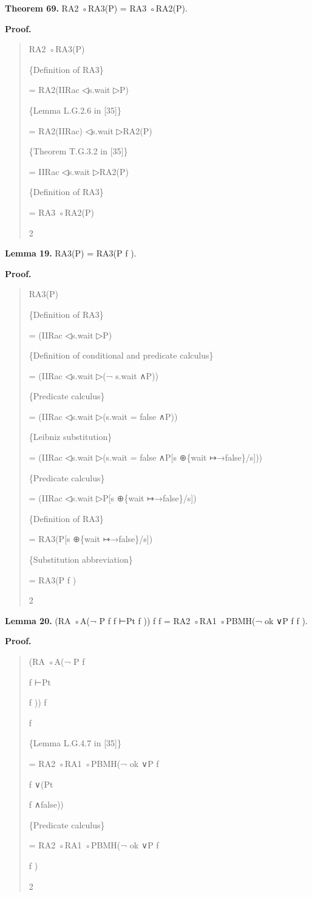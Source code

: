 \documentclass[11pt]{article}
\begin{document}
\noindent\textbf{Theorem 69.} RA2 ◦RA3(P) = RA3 ◦RA2(P).


\noindent\textbf{Proof.}


\begin{quote}\small\raggedright
RA2 ◦RA3(P)
\par
\{Definition of RA3\}
\par
= RA2(IIRac ◁s.wait ▷P)
\par
\{Lemma L.G.2.6 in [35]\}
\par
= RA2(IIRac) ◁s.wait ▷RA2(P)
\par
\{Theorem T.G.3.2 in [35]\}
\par
= IIRac ◁s.wait ▷RA2(P)
\par
\{Definition of RA3\}
\par
= RA3 ◦RA2(P)
\par
2
\end{quote}

\noindent\textbf{Lemma 19.} RA3(P) = RA3(P f ).


\noindent\textbf{Proof.}


\begin{quote}\small\raggedright
RA3(P)
\par
\{Definition of RA3\}
\par
= (IIRac ◁s.wait ▷P)
\par
\{Definition of conditional and predicate calculus\}
\par
= (IIRac ◁s.wait ▷(¬ s.wait ∧P))
\par
\{Predicate calculus\}
\par
= (IIRac ◁s.wait ▷(s.wait = false ∧P))
\par
\{Leibniz substitution\}
\par
= (IIRac ◁s.wait ▷(s.wait = false ∧P[s ⊕\{wait ↦→false\}/s]))
\par
\{Predicate calculus\}
\par
= (IIRac ◁s.wait ▷P[s ⊕\{wait ↦→false\}/s])
\par
\{Definition of RA3\}
\par
= RA3(P[s ⊕\{wait ↦→false\}/s])
\par
\{Substitution abbreviation\}
\par
= RA3(P f )
\par
2
\end{quote}

\noindent\textbf{Lemma 20.} (RA ◦A(¬ P f f ⊢Pt f )) f f = RA2 ◦RA1 ◦PBMH(¬ ok ∨P f f ).


\noindent\textbf{Proof.}


\begin{quote}\small\raggedright
(RA ◦A(¬ P f
\par
f ⊢Pt
\par
f )) f
\par
f
\par
\{Lemma L.G.4.7 in [35]\}
\par
= RA2 ◦RA1 ◦PBMH(¬ ok ∨P f
\par
f ∨(Pt
\par
f ∧false))
\par
\{Predicate calculus\}
\par
= RA2 ◦RA1 ◦PBMH(¬ ok ∨P f
\par
f )
\par
2
\end{quote}
\end{document}
